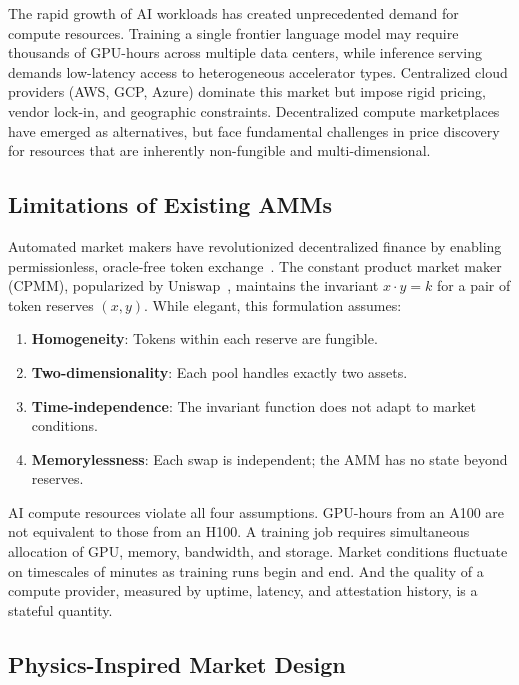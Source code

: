 \documentclass[11pt,twocolumn]{article}
\begin{document}
The rapid growth of AI workloads has created unprecedented demand for compute resources. Training a single frontier language model may require thousands of GPU-hours across multiple data centers, while inference serving demands low-latency access to heterogeneous accelerator types. Centralized cloud providers (AWS, GCP, Azure) dominate this market but impose rigid pricing, vendor lock-in, and geographic constraints. Decentralized compute marketplaces~\cite{golem2016,akash2020,rendernetwork2021} have emerged as alternatives, but face fundamental challenges in price discovery for resources that are inherently non-fungible and multi-dimensional.

\subsection{Limitations of Existing AMMs}

Automated market makers have revolutionized decentralized finance by enabling permissionless, oracle-free token exchange~\cite{adams2020uniswap,egorov2019stableswap,martinelli2019balancer}. The constant product market maker (CPMM), popularized by Uniswap~\cite{adams2021uniswapv3}, maintains the invariant $x \cdot y = k$ for a pair of token reserves $(x, y)$. While elegant, this formulation assumes:

\begin{enumerate}[leftmargin=1.4em]
    \item \textbf{Homogeneity}: Tokens within each reserve are fungible.
    \item \textbf{Two-dimensionality}: Each pool handles exactly two assets.
    \item \textbf{Time-independence}: The invariant function does not adapt to market conditions.
    \item \textbf{Memorylessness}: Each swap is independent; the AMM has no state beyond reserves.
\end{enumerate}

AI compute resources violate all four assumptions. GPU-hours from an A100 are not equivalent to those from an H100. A training job requires simultaneous allocation of GPU, memory, bandwidth, and storage. Market conditions fluctuate on timescales of minutes as training runs begin and end. And the quality of a compute provider, measured by uptime, latency, and attestation history, is a stateful quantity.

\subsection{Physics-Inspired Market Design}
\end{document}
